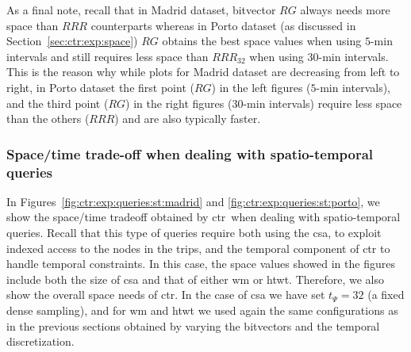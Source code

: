 

	As a final note, recall that in Madrid dataset, bitvector $RG$ always needs more space than $RRR$ counterparts 
	whereas in Porto dataset (as discussed in Section~\ref{sec:ctr:exp:space})
	$RG$ obtains the best space values when using $5$-min intervals and still requires less space than $RRR_{32}$ when using
	$30$-min intervals. 
	This is the reason why while plots for Madrid dataset are decreasing from left to right, in Porto
	dataset the first point ($RG$) in the left figures ($5$-min intervals), and the third point ($RG$) 
	in the right figures ($30$-min intervals) require less space than the others ($RRR$) and are also typically  faster. 


	\subsubsection{Space/time trade-off when dealing with spatio-temporal queries}
	\label{sec:ctr:exp:queries:st}

	In Figures~\ref{fig:ctr:exp:queries:st:madrid} and \ref{fig:ctr:exp:queries:st:porto}, we show the space/time tradeoff obtained by \gls{ctr}\ when 
	dealing with spatio-temporal queries. Recall that this type of queries require both using the \gls{csa}, to 
	exploit indexed access to the nodes in the trips, and the 
	temporal component of \gls{ctr} to handle temporal constraints. In this case, the space values showed in
	the figures include both the size of \gls{csa} and that of either \gls{wm} or \gls{htwt}. Therefore, we also show the
	overall space needs of \gls{ctr}. In the case of \gls{csa} we
	have set $t_{\Psi}=32$ (a fixed dense sampling), and for \gls{wm} and \gls{htwt} we used again the same configurations as in the previous sections obtained by varying the bitvectors and the temporal discretization. 

